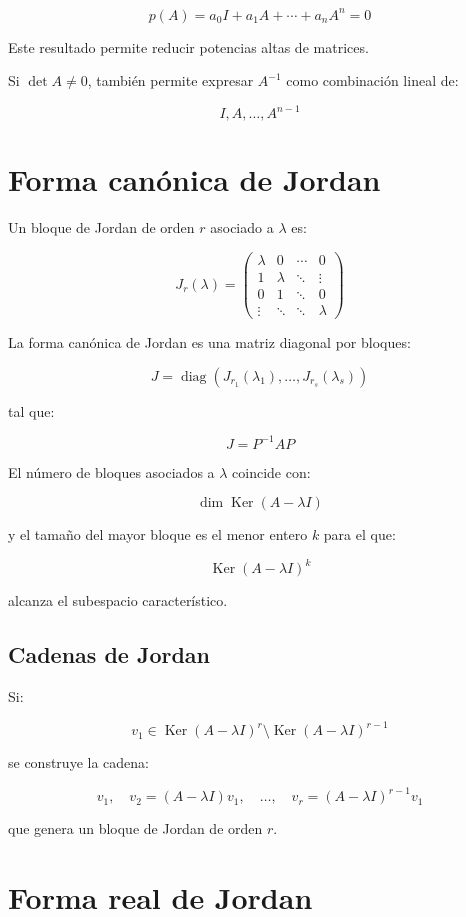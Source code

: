 \documentclass[11pt,a4paper]{article}
\newcommand{\Ker}{\operatorname{Ker}}
\newcommand{\diag}{\operatorname{diag}}
\begin{document}
\[
\boxed{
p(A)
=
a_0I+a_1A+\cdots+a_nA^n
=
0
}
\]

Este resultado permite reducir potencias altas de matrices.

Si $\det A\neq0$, también permite expresar $A^{-1}$ como combinación lineal de:

\[
I,A,\ldots,A^{n-1}
\]

\section{Forma canónica de Jordan}

Un bloque de Jordan de orden $r$ asociado a $\lambda$ es:

\[
J_r(\lambda)
=
\begin{pmatrix}
\lambda&0&\cdots&0\\
1&\lambda&\ddots&\vdots\\
0&1&\ddots&0\\
\vdots&\ddots&\ddots&\lambda
\end{pmatrix}
\]

La forma canónica de Jordan es una matriz diagonal por bloques:

\[
\boxed{
J=
\diag
\left(
J_{r_1}(\lambda_1),
\ldots,
J_{r_s}(\lambda_s)
\right)
}
\]

tal que:

\[
\boxed{
J=P^{-1}AP
}
\]

El número de bloques asociados a $\lambda$ coincide con:

\[
\boxed{
\dim\Ker(A-\lambda I)
}
\]

y el tamaño del mayor bloque es el menor entero $k$ para el que:

\[
\Ker(A-\lambda I)^k
\]

alcanza el subespacio característico.

\subsection{Cadenas de Jordan}

Si:

\[
v_1\in
\Ker(A-\lambda I)^r
\setminus
\Ker(A-\lambda I)^{r-1}
\]

se construye la cadena:

\[
v_1,
\quad
v_2=(A-\lambda I)v_1,
\quad
\ldots,
\quad
v_r=(A-\lambda I)^{r-1}v_1
\]

que genera un bloque de Jordan de orden $r$.

\section{Forma real de Jordan}
\end{document}

